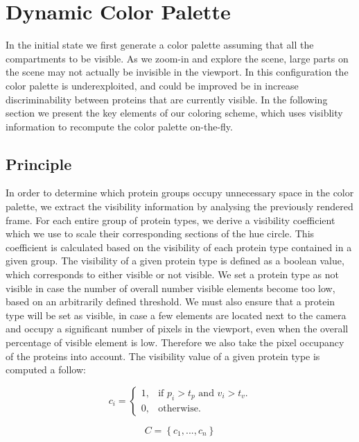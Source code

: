 \documentclass[review,journal]{vgtc}         %
\begin{document}
\section{Dynamic Color Palette}
\label{sec:dynamic_color_palette}

In the initial state we first generate a color palette assuming that all the compartments to be visible.
As we zoom-in and explore the scene, large parts on the scene may not actually be invisible in the viewport.
In this configuration the color palette is underexploited, and could be improved be in increase discriminability between proteins that are currently visible.  
In the following section we present the key elements of our coloring scheme, which uses visiblity information to recompute the color palette on-the-fly.

\subsection{Principle}

In order to determine which protein groups occupy unnecessary space in the color palette, we extract the visibility information by analysing the previously rendered frame.
For each entire group of protein types, we derive a visibility coefficient which we use to scale their corresponding sections of the hue circle. 
This coefficient is calculated based on the visibility of each protein type contained in a given group.
The visibility of a given protein type is defined as a boolean value, which corresponds to either visible or not visible.
We set a protein type as not visible in case the number of overall number visible elements become too low, based on an arbitrarily defined threshold.
We must also ensure that a protein type will be set as visible, in case a few elements are located next to the camera and occupy a significant number of pixels in the viewport, even when the overall percentage of visible element is low.
Therefore we also take the pixel occupancy of the proteins  into account.
The visibility value of a given protein type is computed a follow:

\begin{equation}
c_{i}=\begin{cases}
1, & \text{if $p_{i}>t_{p}$ and $v_{i}>t_{v}$}.\\
0, & \text{otherwise}.
\end{cases}
\end{equation}

\begin{equation}
C = \left\lbrace c_{1}, ... , c_{n} \right\rbrace 
\end{equation}
\end{document}
